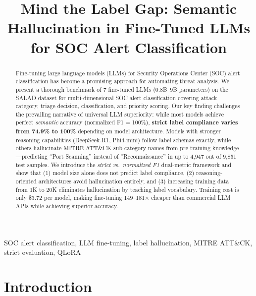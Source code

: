 \documentclass[journal]{IEEEtran}
\begin{document}
\title{Mind the Label Gap: Semantic Hallucination in Fine-Tuned LLMs for SOC Alert Classification}

\author{
}

\maketitle

\begin{abstract}
Fine-tuning large language models (LLMs) for Security Operations Center (SOC) alert classification has become a promising approach for automating threat analysis. We present a thorough benchmark of 7 fine-tuned LLMs (0.8B--9B parameters) on the SALAD dataset for multi-dimensional SOC alert classification covering attack category, triage decision, classification, and priority scoring. Our key finding challenges the prevailing narrative of universal LLM superiority: while most models achieve perfect \emph{semantic} accuracy (normalized F1 = 100\%), \textbf{strict label compliance varies from 74.9\% to 100\%} depending on model architecture. Models with stronger reasoning capabilities (DeepSeek-R1, Phi4-mini) follow label schemas exactly, while others hallucinate MITRE ATT\&CK sub-category names from pre-training knowledge---predicting ``Port Scanning'' instead of ``Reconnaissance'' in up to 4,947 out of 9,851 test samples. We introduce the \emph{strict vs.\ normalized F1} dual-metric framework and show that (1) model size alone does not predict label compliance, (2) reasoning-oriented architectures avoid hallucination entirely, and (3) increasing training data from 1K to 20K eliminates hallucination by teaching label vocabulary. Training cost is only \$3.72 per model, making fine-tuning 149--181$\times$ cheaper than commercial LLM APIs while achieving superior accuracy.
\end{abstract}

\begin{IEEEkeywords}
SOC alert classification, LLM fine-tuning, label hallucination, MITRE ATT\&CK, strict evaluation, QLoRA
\end{IEEEkeywords}

\section{Introduction}
\end{document}
